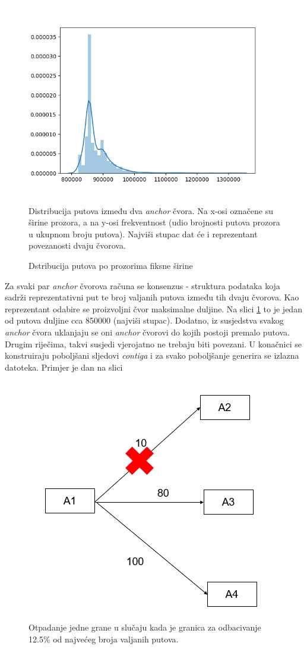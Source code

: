 \documentclass[times, utf8, seminar, numeric]{fer}
\begin{document}
\begin{figure}[h]
	\centering
	\includegraphics[width=0.7\linewidth]{img/distribution}
	\caption{Dstribucija putova po prozorima fiksne širine}
	\label{fig:distribution}
	\small
	Distribucija putova između dva \textit{anchor} čvora. Na x-osi označene su širine prozora, a na y-osi frekventnost (udio brojnosti putova prozora u ukupnom broju putova). Najviši stupac dat će i reprezentant povezanosti dvaju čvorova.
\end{figure}

Za svaki par \textit{anchor} čvorova računa se konsenzus - struktura podataka koja sadrži reprezentativni put te broj valjanih putova između tih dvaju čvorova. Kao reprezentant odabire se proizvoljni čvor maksimalne duljine. Na slici \ref{fig:distribution} to je jedan od putova duljine cca 850000 (najviši stupac). Dodatno, iz susjedstva svakog \textit{anchor} čvora uklanjaju se oni \textit{anchor} čvorovi do kojih postoji premalo putova. Drugim riječima, takvi susjedi vjerojatno ne trebaju biti povezani. U konačnici se konstruiraju poboljšani sljedovi \textit{contiga} i za svako poboljšanje generira se izlazna datoteka. Primjer je dan na slici %

\begin{figure}[h]
	\centering
	\includegraphics[width=0.7\linewidth]{img/valid_path_numbers_filtered}
	\caption{Otpadanje jedne grane u slučaju kada je granica za odbacivanje 12.5\% od najvećeg broja valjanih putova.}
	\label{fig:validpathnumbersfiltered}
\end{figure}
\end{document}
